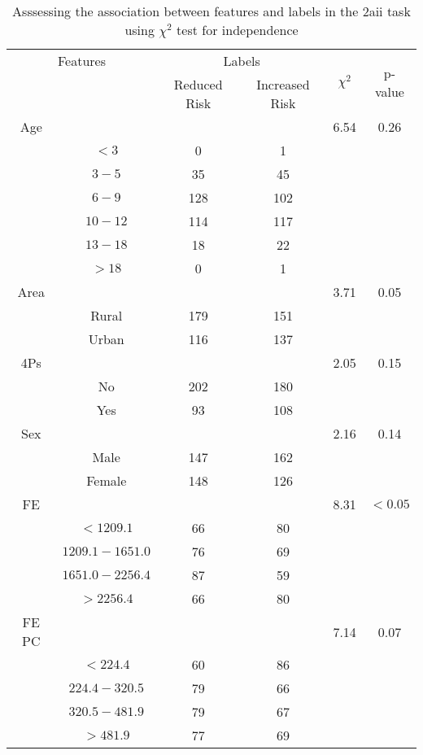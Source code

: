 \begin{table}[!htb]
\centering
\caption{Asssessing the association between features and labels in the 2aii task using $\chi^2$ test for independence}
\label{tab:chitest_2aii}
\begin{tabular}{c c | c c| c | c}
\hline
\multicolumn{2}{c|}{Features}& \multicolumn{2}{c|}{Labels}& \multirow{2}{*}{$\chi^2$} & \multirow{2}{*}{p-value}\\ 
& & Reduced Risk & Increased Risk & & \\ 
\hline
Age &  &  & & 6.54 & 0.26 \\ 
& $< 3$ & 0 & 1& & \\ 
& $3-5$ & 35 & 45& & \\ 
& $6-9$ & 128 & 102& & \\ 
& $10-12$ & 114 & 117& & \\ 
& $13-18$ & 18 & 22& & \\ 
& $> 18$ & 0 & 1& & \\ 
\hline 
Area &  &  & & 3.71 & 0.05 \\ 
& Rural & 179 & 151& & \\ 
& Urban & 116 & 137& & \\ 
\hline 
4Ps &  &  & & 2.05 & 0.15 \\ 
& No & 202 & 180& & \\ 
& Yes & 93 & 108& & \\ 
\hline 
Sex &  &  & & 2.16 & 0.14 \\ 
& Male & 147 & 162& & \\ 
& Female & 148 & 126& & \\ 
\hline 
FE &  &  & & 8.31 & $< 0.05$ \\ 
& $< 1209.1$ & 66 & 80& & \\ 
& $1209.1-1651.0$ & 76 & 69& & \\ 
& $1651.0-2256.4$ & 87 & 59& & \\ 
& $> 2256.4$ & 66 & 80& & \\ 
\hline 
FE PC &  &  & & 7.14 & 0.07 \\ 
& $< 224.4$ & 60 & 86& & \\ 
& $224.4-320.5$ & 79 & 66& & \\ 
& $320.5-481.9$ & 79 & 67& & \\ 
& $> 481.9$ & 77 & 69& & \\ 
\hline 
\end{tabular}
\end{table}
